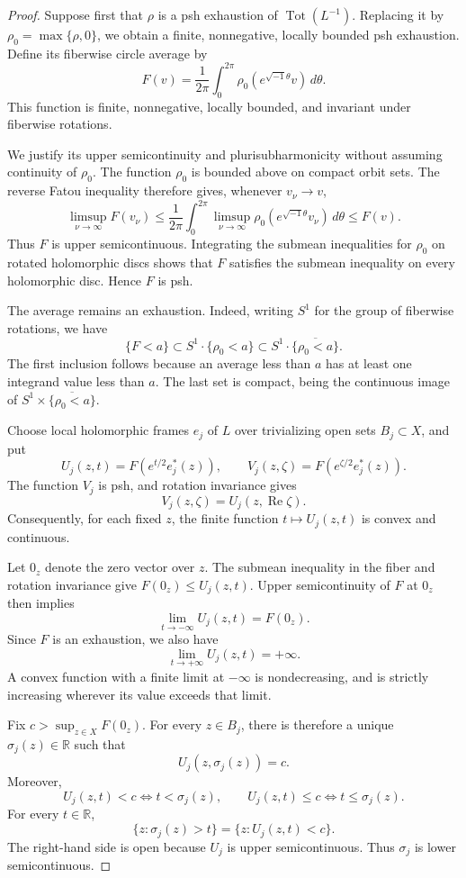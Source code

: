 \documentclass[11pt]{amsart}
\theoremstyle{definition}
\theoremstyle{remark}
\numberwithin{equation}{section}
\newcommand{\R}{\mathbb R}
\newcommand{\Tot}{\operatorname{Tot}}
\begin{document}
\begin{proof}
Suppose first that $\rho$ is a psh exhaustion of $\Tot(L^{-1})$.
Replacing it by $\rho_0=\max\{\rho,0\}$, we obtain a finite,
nonnegative, locally bounded psh exhaustion. Define its
fiberwise circle average by
\[
 F(v)=\frac1{2\pi}\int_0^{2\pi}
       \rho_0(e^{\sqrt{-1}\theta}v)\,d\theta.
\]
This function is finite, nonnegative, locally bounded, and
invariant under fiberwise rotations.

We justify its upper semicontinuity and plurisubharmonicity
without assuming continuity of $\rho_0$. The function $\rho_0$
is bounded above on compact orbit sets. The reverse Fatou
inequality therefore gives, whenever $v_\nu\to v$,
\[
 \limsup_{\nu\to\infty}F(v_\nu)
 \le\frac1{2\pi}\int_0^{2\pi}
       \limsup_{\nu\to\infty}
       \rho_0(e^{\sqrt{-1}\theta}v_\nu)\,d\theta
 \le F(v).
\]
Thus $F$ is upper semicontinuous. Integrating the submean
inequalities for $\rho_0$ on rotated holomorphic discs shows
that $F$ satisfies the submean inequality on every holomorphic
disc. Hence $F$ is psh.

The average remains an exhaustion. Indeed, writing $S^1$ for
the group of fiberwise rotations, we have
\[
 \{F<a\}\subset S^1\cdot\{\rho_0<a\}
 \subset S^1\cdot\overline{\{\rho_0<a\}}.
\]
The first inclusion follows because an average less than $a$
has at least one integrand value less than $a$. The last set
is compact, being the continuous image of
$S^1\times\overline{\{\rho_0<a\}}$.

Choose local holomorphic frames $e_j$ of $L$ over trivializing
open sets $B_j\subset X$, and put
\[
 U_j(z,t)=F(e^{t/2}e_j^*(z)),\qquad
 V_j(z,\zeta)=F(e^{\zeta/2}e_j^*(z)).
\]
The function $V_j$ is psh, and rotation invariance gives
\[
 V_j(z,\zeta)=U_j(z,\operatorname{Re}\zeta).
\]
Consequently, for each fixed $z$, the finite function
$t\mapsto U_j(z,t)$ is convex and continuous.

Let $0_z$ denote the zero vector over $z$. The submean
inequality in the fiber and rotation invariance give
$F(0_z)\le U_j(z,t)$. Upper semicontinuity of $F$ at $0_z$
then implies
\[
 \lim_{t\to-\infty}U_j(z,t)=F(0_z).
\]
Since $F$ is an exhaustion, we also have
\[
 \lim_{t\to+\infty}U_j(z,t)=+\infty.
\]
A convex function with a finite limit at $-\infty$ is
nondecreasing, and is strictly increasing wherever its value
exceeds that limit.

Fix $c>\sup_{z\in X}F(0_z)$. For every $z\in B_j$, there
is therefore a unique $\sigma_j(z)\in\R$ such that
\[
 U_j(z,\sigma_j(z))=c.
\]
Moreover,
\[
 U_j(z,t)<c\iff t<\sigma_j(z),\qquad
 U_j(z,t)\le c\iff t\le\sigma_j(z).
\]
For every $t\in\R$,
\[
 \{z:\sigma_j(z)>t\}=\{z:U_j(z,t)<c\}.
\]
The right-hand side is open because $U_j$ is upper
semicontinuous. Thus $\sigma_j$ is lower semicontinuous.


\end{proof}
\end{document}
